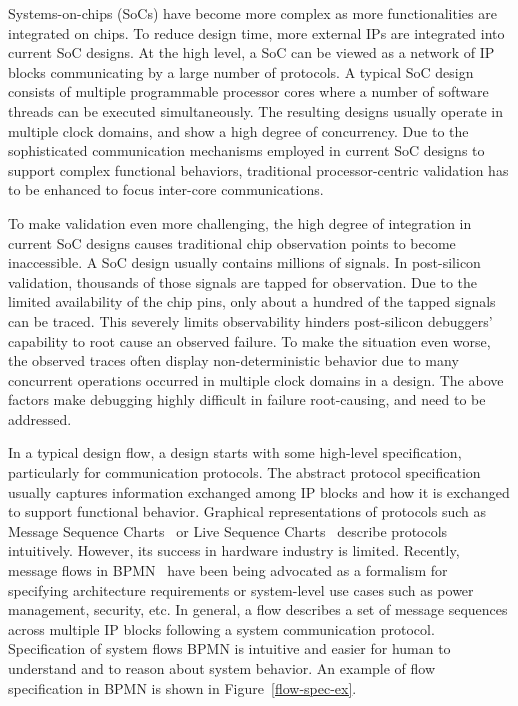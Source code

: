 \documentclass[conference]{IEEEtran}
\begin{document}
Systems-on-chips (SoCs) have become more complex as more functionalities are integrated on chips.  To reduce design time, more external IPs are integrated into current SoC designs. At the high level, a SoC can be viewed as a network of IP blocks communicating by a large number of protocols.  A typical SoC design consists of multiple programmable processor cores where a number of software threads can be executed simultaneously.  The resulting designs usually operate in multiple clock domains, and show a high degree of concurrency.  Due to the sophisticated communication mechanisms employed in  current SoC designs to support complex functional behaviors, traditional processor-centric validation has to be enhanced to focus inter-core communications. 

To make validation even more challenging, the high degree of integration in current SoC designs causes traditional chip observation points to become inaccessible.  A SoC design usually contains millions of signals.  In post-silicon validation, thousands of those signals are tapped for observation.  Due to the limited availability of the chip pins, only about a hundred of the tapped signals can be traced.   This severely limits observability hinders post-silicon debuggers' capability to root cause an observed failure.  To make the situation even worse, the observed traces often display non-deterministic behavior due to many concurrent operations occurred in multiple clock domains in a design.  The above factors make debugging highly difficult in failure root-causing, and need to be addressed.

In a typical design flow, a design starts with some high-level specification, particularly for communication protocols.   The abstract protocol specification usually captures information exchanged among IP blocks and how it is exchanged to support functional behavior. 
Graphical representations of protocols such as Message Sequence Charts~\cite{Harel03} or Live Sequence Charts~\cite{Damm99} describe protocols intuitively.  However, its success in hardware industry is limited.  Recently, message flows in BPMN~\cite{Krstic14HOST} have been being advocated as a formalism for specifying architecture requirements
 or system-level use cases such as power management, security, etc.  In general, a flow describes a set of message sequences across multiple IP blocks following a system communication protocol.  Specification of system flows BPMN is intuitive and easier for human to understand and to reason about system behavior.  An example of flow specification in BPMN is shown in Figure~\ref{flow-spec-ex}.
 
\end{document}
